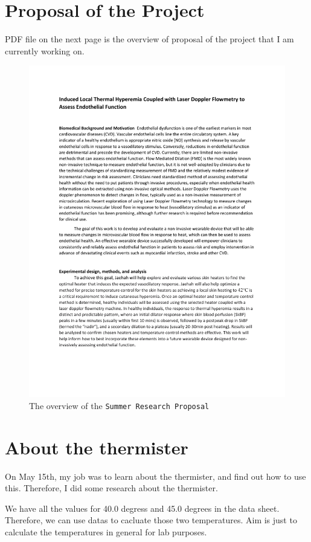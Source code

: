 \documentclass{article}
\begin{document}
\section{Proposal of the Project}
PDF file on the next page is the overview of proposal of the project that I am currently working on.
\begin{figure}[htpb]
    \centering
    \includegraphics[width=1.1\textwidth]{Jaehah summer research proposal.pdf}
    \caption{The overview of the \texttt{Summer Research Proposal}}
    \label{fig:s_r}
\end{figure}

\section{About the thermister}
On May 15th, my job was to learn about the thermister, and find out how to use this.
Therefore, I did some research about the thermister.

We have all the values for 40.0 degress and 45.0 degrees in the data sheet.
Therefore, we can use datas to cacluate those two temperatures. 
Aim is just to calculate the temperatures in general for lab purposes.
\end{document}
